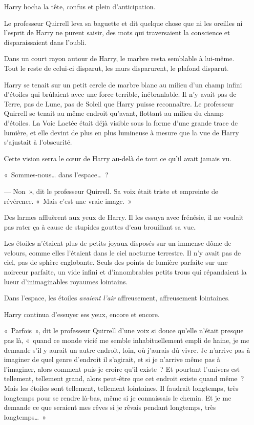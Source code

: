 Harry hocha la tête, confus et plein d'anticipation.

Le professeur Quirrell leva sa baguette et dit quelque chose que ni les oreilles ni l'esprit de Harry ne purent saisir, des mots qui traversaient la conscience et disparaissaient dans l'oubli.

Dans un court rayon autour de Harry, le marbre resta semblable à lui-même.
Tout le reste de celui-ci disparut, les murs disparurent, le plafond disparut.

Harry se tenait sur un petit cercle de marbre blanc au milieu d'un champ infini d'étoiles qui brûlaient avec une force terrible, inébranlable.
Il n'y avait pas de Terre, pas de Lune, pas de Soleil que Harry puisse reconnaître.
Le professeur Quirrell se tenait au même endroit qu'avant, flottant au milieu du champ d'étoiles.
La Voie Lactée était déjà visible sous la forme d'une grande trace de lumière, et elle devint de plus en plus lumineuse à mesure que la vue de Harry s'ajustait à l'obscurité.

Cette vision serra le cœur de Harry au-delà de tout ce qu'il avait jamais vu.

«~Sommes-nous… dans l'espace…~?

--- Non~», dit le professeur Quirrell.
Sa voix était triste et empreinte de révérence.
«~Mais c'est une vraie image.~»

Des larmes affluèrent aux yeux de Harry.
Il les essuya avec frénésie, il ne voulait pas rater ça à cause de stupides gouttes d'eau brouillant sa vue.

Les étoiles n'étaient plus de petits joyaux disposés sur un immense dôme de velours, comme elles l'étaient dans le ciel nocturne terrestre.
Il n'y avait pas de ciel, pas de sphère englobante.
Seuls des points de lumière parfaite sur une noirceur parfaite, un vide infini et d'innombrables petits trous qui répandaient la lueur d'inimaginables royaumes lointains.

Dans l'espace, les étoiles \emph{avaient l'air} affreusement, affreusement lointaines.

Harry continua d'essuyer ses yeux, encore et encore.

«~Parfois~», dit le professeur Quirrell d'une voix si douce qu'elle n'était presque pas là, «~quand ce monde vicié me semble inhabituellement empli de haine, je me demande s'il y aurait un autre endroit, loin, où j'aurais dû vivre.
Je n'arrive pas à imaginer de quel genre d'endroit il s'agirait, et si je n'arrive même pas à l'imaginer, alors comment puis-je croire qu'il existe~?
Et pourtant l'univers est tellement, tellement grand, alors peut-être que cet endroit existe quand même~?
Mais les étoiles sont tellement, tellement lointaines.
Il faudrait longtemps, très longtemps pour se rendre là-bas, même si je connaissais le chemin.
Et je me demande ce que seraient mes rêves si je rêvais pendant longtemps, très longtemps…~»

